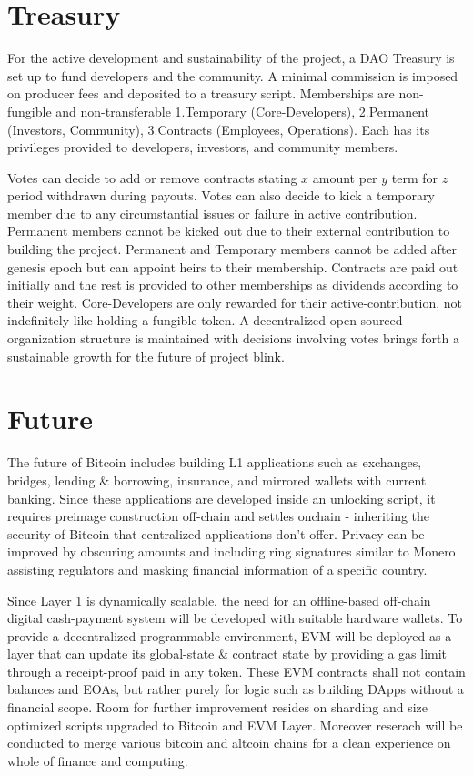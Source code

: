 \documentclass[a4paper,10pt]{article}
\begin{document}
\section{Treasury}
For the active development and sustainability of the project, a DAO Treasury is set up to fund developers and the community. A minimal commission is imposed on producer fees and deposited to a treasury script. Memberships are non-fungible and non-transferable 1.Temporary (Core-Developers), 2.Permanent (Investors, Community), 3.Contracts (Employees, Operations). Each has its privileges provided to developers, investors, and community members. 

Votes can decide to add or remove contracts stating $x$ amount per $y$ term for $z$ period withdrawn during payouts. Votes can also decide to kick a temporary member due to any circumstantial issues or failure in active contribution. Permanent members cannot be kicked out due to their external contribution to building the project. Permanent and Temporary members cannot be added after genesis epoch but can appoint heirs to their membership. Contracts are paid out initially and the rest is provided to other memberships as dividends according to their weight. Core-Developers are only rewarded for their active-contribution, not indefinitely like holding a fungible token. A decentralized open-sourced organization structure is maintained with decisions involving votes brings forth a sustainable growth for the future of project blink. 
\section{Future}

The future of Bitcoin includes building L1 applications such as exchanges, bridges, lending \& borrowing, insurance, and mirrored wallets with current banking. Since these applications are developed inside an unlocking script, it requires preimage construction off-chain and settles onchain - inheriting the security of Bitcoin that centralized applications don't offer. Privacy can be improved by obscuring amounts and including ring signatures similar to Monero assisting regulators and masking financial information of a specific country. 

Since Layer 1 is dynamically scalable, the need for an offline-based off-chain digital cash-payment system will be developed with suitable hardware wallets. To provide a decentralized programmable environment, EVM will be deployed as a layer that can update its global-state \& contract state by providing a gas limit through a receipt-proof paid in any token. These EVM contracts shall not contain balances and EOAs, but rather purely for logic such as building DApps without a financial scope. Room for further improvement resides on sharding and size optimized scripts upgraded to Bitcoin and EVM Layer. Moreover reserach will be conducted to merge various bitcoin and altcoin chains for a clean experience on whole of finance and computing.\\
\end{document}

